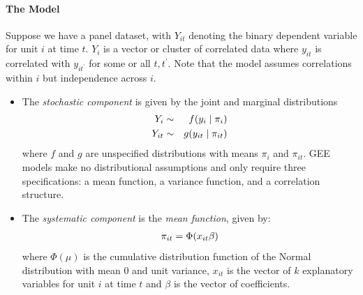 \documentclass[letterpaper,10pt,english]{sphinxmanual}
\begin{document}
\paragraph{The Model}
\label{zelig-probitgee:the-model}
Suppose we have a panel dataset, with \(Y_{it}\) denoting the binary
dependent variable for unit \(i\) at time \(t\). \(Y_{i}\)
is a vector or cluster of correlated data where \(y_{it}\) is
correlated with \(y_{it^\prime}\) for some or all
\(t, t^\prime\). Note that the model assumes correlations within
\(i\) but independence across \(i\).
\begin{itemize}
\item {} 
The \emph{stochastic component} is given by the joint and marginal
distributions
\begin{gather}
\begin{split}\begin{aligned}
Y_{i} &\sim& f(y_{i} \mid \pi_{i})\\
Y_{it} &\sim& g(y_{it} \mid \pi_{it})\end{aligned}\end{split}\notag
\end{gather}
where \(f\) and \(g\) are unspecified distributions with
means \(\pi_{i}\) and \(\pi_{it}\). GEE models make no
distributional assumptions and only require three specifications: a
mean function, a variance function, and a correlation structure.

\item {} 
The \emph{systematic component} is the \emph{mean function}, given by:
\begin{gather}
\begin{split}\pi_{it} = \Phi(x_{it} \beta)\end{split}\notag
\end{gather}
where \(\Phi(\mu)\) is the cumulative distribution function of
the Normal distribution with mean 0 and unit variance, \(x_{it}\)
is the vector of \(k\) explanatory variables for unit \(i\)
at time \(t\) and \(\beta\) is the vector of coefficients.


\end{itemize}
\end{document}
